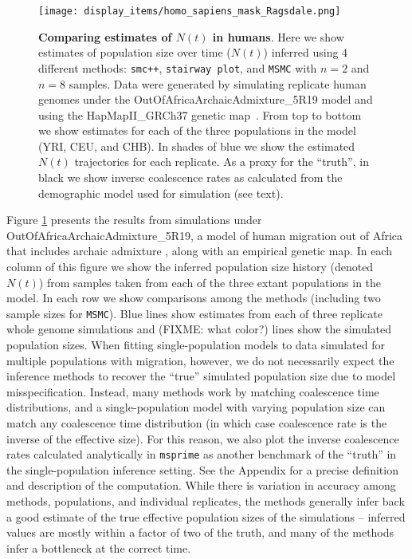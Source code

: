 \documentclass[12pt,halfline,a4paper]{ouparticle}
\newcommand{\MSMC}{\texttt{MSMC}\xspace}
\newcommand{\smcpp}{\texttt{smc++}\xspace}
\begin{document}
\begin{figure}
\begin{center}
\texttt{[image: display\_items/homo\_sapiens\_mask\_Ragsdale.png]}
\caption{\textbf{Comparing estimates of $N(t)$ in humans}. Here we show estimates of population
size over time ($N(t)$) inferred using 4 different methods: \smcpp, \texttt{stairway plot}, and
\MSMC with $n=2$ and $n=8$ samples. Data were generated by simulating
replicate human genomes under the OutOfAfricaArchaicAdmixture\_5R19 model \citep{ragsdale2019models} and using the
HapMapII\_GRCh37 genetic map~\citep{international2007second}. From top to bottom we show estimates for each
of the three populations in the model (YRI, CEU, and CHB). In shades of blue we show the estimated
$N(t)$ trajectories for each replicate.
As a proxy for the ``truth'', in black we show inverse coalescence rates
as calculated from the demographic model used for simulation (see text).
}
\label{fig:n_t_ragsdale}
\end{center}
\end{figure}


Figure \ref{fig:n_t_ragsdale} presents the results
from simulations under OutOfAfricaArchaicAdmixture\_5R19,
a model of human migration out of Africa that includes archaic admixture
\citep{ragsdale2019models}, along with an empirical genetic map. In each column of this figure
we show the inferred population size history (denoted $N(t)$)
from samples taken from each of the three extant populations in the model.
In each row we show comparisons among the methods (including two sample sizes for \MSMC).
Blue lines show estimates from each of three replicate whole genome simulations and (FIXME: what color?)
lines show the simulated population sizes.
When fitting single-population models to data simulated for multiple
populations with migration, however, we do not necessarily expect the inference methods to recover the 
``true'' simulated population size due to model misspecification.
Instead, many methods work by matching coalescence time distributions,
and a single-population model with varying population size can match any coalescence time distribution
(in which case coalescence rate is the inverse of the effective size).
For this reason,
we also plot the inverse coalescence rates calculated analytically in \texttt{msprime}
as another benchmark of the ``truth'' in the single-population inference setting. 
See the Appendix for a precise definition and description of the computation.
While there is variation in accuracy among methods, populations, and individual replicates,
the methods generally infer back a good estimate
of the true effective population sizes of the simulations --
inferred values are mostly within a factor of two of the truth,
and many of the methods infer a bottleneck at the correct time.
\end{document}
